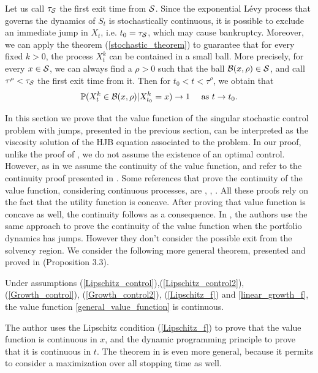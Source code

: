 Let us call $\tau_{\mathcal{S}}$ the first exit time from $\mathcal{S}$.
Since the exponential Lévy process that governs the dynamics of $S_t$ is stochastically continuous,
it is possible to exclude an immediate jump in $X_t$, i.e. $t_0 = \tau_{\mathcal{S}}$, which may cause bankruptcy.
Moreover, we can apply the theorem (\ref{stochastic_theorem}) to guarantee that for every fixed $k>0$, the process $X^k_t$ can be contained in a small ball.  
More precisely, for every $x \in \mathcal{S}$, 
we can always find a $\rho>0$ such that the ball $\mathcal{B}(x, \rho) \in \mathcal{S}$, and call $\tau^{\rho} < \tau_{\mathcal{S}}$ the first exit time from it.   
Then for $t_0 < t < \tau^{\rho}$, we obtain that $$\mathbb{P}( X^k_{t} \in \mathcal{B}(x, \rho) | X^k_{t_0} = x) \to 1 \quad \mbox{ as } t \to t_0.$$

In this section we prove that the value function of the singular stochastic control problem with jumps, presented in the previous section, can be interpreted 
as the viscosity solution of the HJB equation associated to the problem.
In our proof, unlike the proof of \cite{DaPaZa93}, we do not assume the existence of an optimal control. 
However, as in \cite{DaPaZa93} we assume the continuity of the value function, and refer to the continuity proof presented in \cite{Ph98}. 
Some references that prove the continuity of the value function, considering continuous processes, are 
\cite{ShSo94}, \cite{Pham}, \cite{Damgaard}. All these proofs rely on the fact that the utility function is concave. After proving that value function is concave 
as well, the continuity follows as a consequence.  
In \cite{OkSu01}, the authors use the same approach to prove the continuity of the value function when the portfolio dynamics has jumps. 
However they don't consider the possible exit from the solvency region. 
We consider the following more general theorem, presented and proved in \cite{Ph98} (Proposition 3.3).
\begin{Theorem}\label{continuity_VF}
 Under assumptions  (\ref{Lipschitz_control}),(\ref{Lipschitz_control2}), (\ref{Growth_control}), (\ref{Growth_control2}), (\ref{Lipschitz_f}) and \ref{linear_growth_f}, 
 the value function \ref{general_value_function} is continuous. 
\end{Theorem}
The author uses the Lipschitz condition (\ref{Lipschitz_f}) to prove that the value function is continuous in $x$, and the dynamic programming principle to prove that it is continuous
in $t$. The theorem in \cite{Ph98} is even more general, because it permits to consider a maximization over all stopping time as well.\\
